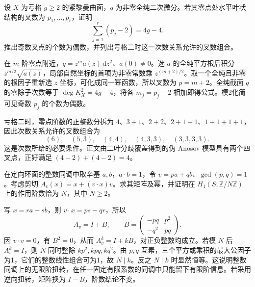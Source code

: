 \begin{exercise}
	设 \(X\) 为亏格 \(g\ge2\) 的紧黎曼曲面，\(q\) 为非零全纯二次微分。若其零点处水平叶状结构的叉数为 \(p_1,\ldots,p_r\)，证明
	\[
		\sum_{j=1}^r(p_j-2)=4g-4.
	\]
	推出奇数叉点的个数为偶数，并列出亏格二时这一次数关系允许的叉数组合。
\end{exercise}
\begin{solution}
	在 \(m\) 阶零点附近，\(q=z^m a(z)\,\mathrm{d}z^2\)、\(a(0)\ne0\)。选 \(a\) 的全纯平方根后积分 \(z^{m/2}\sqrt{a(z)}\)，局部自然坐标的首项为非零常数乘 \(z^{(m+2)/2}\)。取一个全纯且非零的根因子重新选 \(z\) 坐标，可化成同一幂函数，所以叉数为 \(p=m+2\)。全纯截面 \(q\) 的零除子次数等于 \(\deg K_X^2=4g-4\)，将各 \(m_j=p_j-2\) 相加即得公式。模2化简可见奇数 \(p_j\) 的个数为偶数。

	亏格二时，零点阶数的正整数分拆为 \(4\)、\(3+1\)、\(2+2\)、\(2+1+1\)、\(1+1+1+1\)，因此次数关系允许的叉数组合为
	\[
		(6),\quad(5,3),\quad(4,4),\quad(4,3,3),\quad(3,3,3,3).
	\]
	这是次数所给的必要条件。正文由二叶分歧覆盖得到的伪 Anosov 模型具有两个四叉点，正好满足 \((4-2)+(4-2)=4\)。
\end{solution}

\begin{exercise}
	在定向环面的整数同调中取辛基 \(a,b\)，\(a\cdot b=1\)，令 \(v=pa+qb\)、\(\gcd(p,q)=1\)。考虑剪切 \(A_v(x)=x+(v\cdot x)v\)。求其矩阵及幂，并证明在 \(H_1(S;\mathbb Z/N\mathbb Z)\) 上的作用阶数恰为 \(N\)，其中 \(N\ge2\)。
\end{exercise}
\begin{solution}
	写 \(x=ra+sb\)，则 \(v\cdot x=ps-qr\)，所以
	\[
		A_v=I+B,\qquad B=\begin{pmatrix}-pq&p^2\\-q^2&pq\end{pmatrix}.
	\]
	因 \(v\cdot v=0\)，有 \(B^2=0\)，从而 \(A_v^k=I+kB\)，对正负整数均成立。若模 \(N\) 后 \(A_v^k=I\)，则 \(N\) 同时整除 \(kp^2,kpq,kq^2\)。由 \(p,q\) 互素，三个平方或乘积的最大公因子为1，它们的整数线性组合可为1，故 \(N\mid k\)。反之 \(N\mid k\) 时显然恒等。这说明整数同调上的无限阶扭转，在任一固定有限系数的同调中只能留下有限阶信息。若采用逆向扭转，矩阵换为 \(I-B\)，阶数结论不变。
\end{solution}
